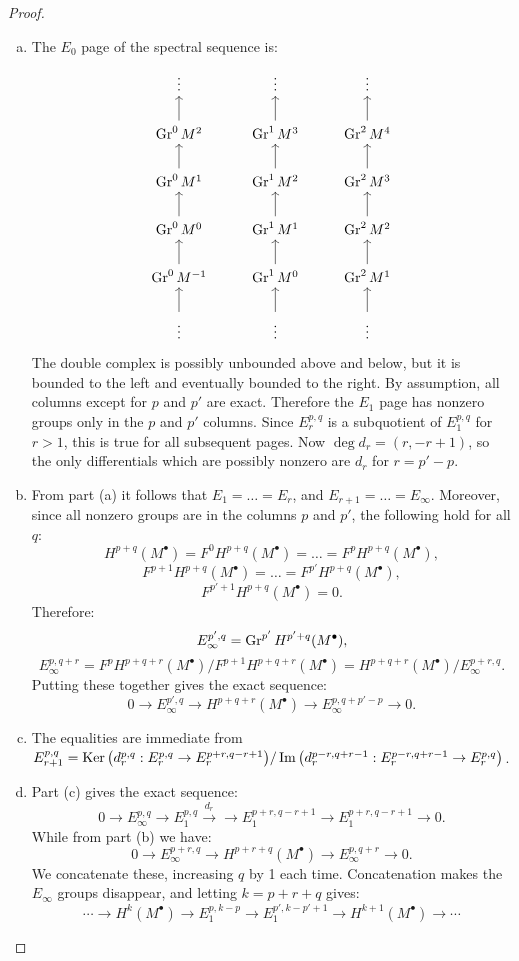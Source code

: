 \documentclass{article}
\begin{document}
\begin{proof}
\text{  }
\begin{enumerate}[(a)]
\item The $E_0$ page of the spectral sequence is:
\[
\begin{tikzcd}
\vdots & \vdots & \vdots \\
\Gr^0 M^2\arrow{u} & \Gr^1 M^3\arrow{u} & \Gr^2 M^4\arrow{u} \\
\Gr^0 M^1\arrow{u} & \Gr^1 M^2\arrow{u} & \Gr^2 M^3\arrow{u} \\
\Gr^0 M^0\arrow{u} & \Gr^1 M^1\arrow{u} & \Gr^2 M^2\arrow{u} \\
\Gr^0 M^{-1}\arrow{u} & \Gr^1 M^0\arrow{u} & \Gr^2 M^1\arrow{u} \\
\vdots\arrow{u} & \vdots\arrow{u} & \vdots\arrow{u} 
\end{tikzcd}
\]
The double complex is possibly unbounded above and below, but it is bounded to the left and eventually bounded 
to the right. By assumption, all columns except for $p$ and $p'$ are exact. Therefore the $E_1$ page has nonzero
groups only in the $p$ and $p'$ columns. Since $E_r^{p,q}$ is a subquotient of $E_1^{p,q}$ for $r>1$, this is true
for all subsequent pages. Now $\deg d_r = (r,-r+1)$, so the only differentials which are possibly nonzero are
$d_r$ for $r = p'-p$.

\item From part (a) it follows that $E_1 = \dots = E_r$, and $E_{r+1} = \dots = E_{\infty}$. Moreover, since all
nonzero groups are in the columns $p$ and $p'$, the following hold for all $q$:
\[	H^{p+q}(M^{\bullet}) = F^0 H^{p+q}(M^{\bullet}) = \dots = F^p H^{p+q}(M^{\bullet}), 	\]
\[	F^{p+1} H^{p+q}(M^{\bullet}) = \dots = F^{p'} H^{p+q}(M^{\bullet}), \]
\[	F^{p'+1} H^{p+q}(M^{\bullet}) = 0.	\]
Therefore:
\[	E_{\infty}^{p',q} = \operatorname{Gr}^{p'} H^{p'+q}(M^{\bullet}),	\]
\[	E_{\infty}^{p,q+r} = F^p H^{p+q+r}(M^{\bullet})	/ F^{p+1} H^{p+q+r}(M^{\bullet}) = 
H^{p+q+r}(M^{\bullet}) / E_{\infty}^{p+r,q}. \]
Putting these together gives the exact sequence:
\[	0 \to E_{\infty}^{p',q} \to H^{p+q+r}(M^{\bullet}) \to E_{\infty}^{p,q+p'-p} \to 0. 	\]

\item The equalities are immediate from $E_{r+1}^{p,q} = \operatorname{Ker} \big(d_r^{p,q} : E_r^{p,q} \to E_r^{p+r,q-r+1}\big)
/ \operatorname{Im} \big(d_r^{p-r,q+r-1} : E_r^{p-r,q+r-1} \to E_r^{p,q}\big)$.

\item Part (c) gives the exact sequence:
\[	0 \to E_{\infty}^{p,q} \to E_{1}^{p,q} \overset{d_r}{\to} \to E_{1}^{p+r,q-r+1} \to E_{1}^{p+r,q-r+1} \to 0. 	\]
While from part (b) we have:
\[	0 \to E_{\infty}^{p+r,q} \to H^{p+r+q}(M^{\bullet}) \to E_{\infty}^{p,q+r} \to 0.	\]
We concatenate these, increasing $q$ by 1 each time. Concatenation makes the $E_{\infty}$ groups disappear,
and letting $k= p+r+q$ gives:
\[	\cdots \to H^k(M^{\bullet}) \to E_1^{p,k-p} \to E_1^{p',k-p'+1} \to H^{k+1}(M^{\bullet}) \to \cdots	\]

\end{enumerate}
\end{proof}




{}

\end{document}
